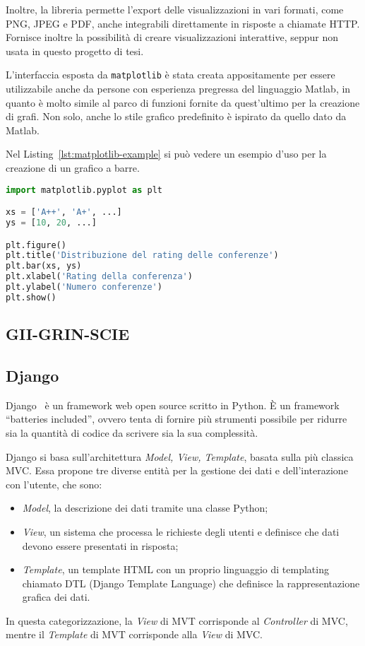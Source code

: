 Inoltre, la libreria permette l'export delle visualizzazioni in vari formati,
come PNG, JPEG e PDF, anche integrabili direttamente in risposte a chiamate HTTP.
Fornisce inoltre la possibilità di creare visualizzazioni interattive, seppur
non usata in questo progetto di tesi.

L'interfaccia esposta da \texttt{matplotlib} è stata creata appositamente per
essere utilizzabile anche da persone con esperienza pregressa del linguaggio
Matlab, in quanto è molto simile al parco di funzioni fornite da quest'ultimo
per la creazione di grafi. Non solo, anche lo stile grafico predefinito è
ispirato da quello dato da Matlab.

Nel Listing~\ref{lst:matplotlib-example} si può vedere un esempio d'uso per
la creazione di un grafico a barre.

\begin{lstlisting}[float, language=Python, caption=Esempio d'uso di \texttt{matplotlib}, label=lst:matplotlib-example]
import matplotlib.pyplot as plt

xs = ['A++', 'A+', ...]
ys = [10, 20, ...]

plt.figure()
plt.title('Distribuzione del rating delle conferenze')
plt.bar(xs, ys)
plt.xlabel('Rating della conferenza')
plt.ylabel('Numero conferenze')
plt.show()
\end{lstlisting}

\subsection{GII-GRIN-SCIE}

\subsection{Django}\label{sec:django}

Django~\cite{django} è un framework web open source scritto in Python. È
un framework ``batteries included'', ovvero tenta di fornire più strumenti
possibile per ridurre sia la quantità di codice da scrivere sia la sua
complessità.

Django si basa sull'architettura \textit{Model, View, Template}, basata sulla più
classica MVC. Essa propone tre diverse entità per la gestione dei dati e dell'interazione
con l'utente, che sono:
\begin{itemize}
	\item \textit{Model}, la descrizione dei dati tramite una classe Python;
	\item \textit{View}, un sistema che processa le richieste degli utenti e
	definisce che dati devono essere presentati in risposta;
	\item \textit{Template}, un template HTML con un proprio linguaggio di templating
	chiamato DTL (Django Template Language) che definisce la rappresentazione
	grafica dei dati.
\end{itemize}
In questa categorizzazione, la \textit{View} di MVT corrisponde al \textit{Controller}
di MVC, mentre il \textit{Template} di MVT corrisponde alla \textit{View} di MVC.

